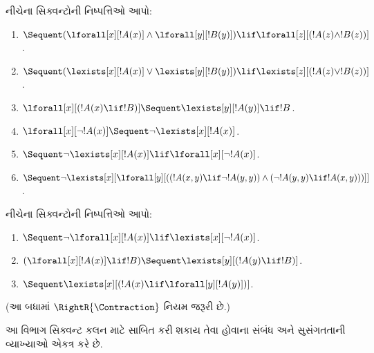 \begin{prob}
નીચેના સિક્વન્ટોની નિષ્પત્તિઓ આપો:
\begin{enumerate}
\item $\Sequent (\lforall[x][!A(x)] \land \lforall[y][!B(y)]) \lif
\lforall[z][(!A(z) \land !B(z))]$.
\item $\Sequent (\lexists[x][!A(x)] \lor \lexists[y][!B(y)]) \lif
\lexists[z][(!A(z) \lor !B(z))]$.
\item $\lforall[x][(!A(x) \lif !B)] \Sequent \lexists[y][!A(y)] \lif !B$.
\item $\lforall[x][\lnot !A(x)] \Sequent \lnot\lexists[x][!A(x)]$.
\item $\Sequent \lnot\lexists[x][!A(x)] \lif \lforall[x][\lnot !A(x)]$.
\item $\Sequent \lnot\lexists[x][\lforall[y][((!A(x,y) \lif \lnot
!A(y,y)) \land (\lnot !A(y,y) \lif !A(x,y)))]]$.
\end{enumerate}
\end{prob}

\begin{prob}
નીચેના સિક્વન્ટોની નિષ્પત્તિઓ આપો:
\begin{enumerate}
\item $\Sequent \lnot\lforall[x][!A(x)] \lif \lexists[x][\lnot!A(x)]$.
\item $(\lforall[x][!A(x)] \lif !B) \Sequent \lexists[y][(!A(y) \lif !B)]$.
\item $\Sequent \lexists[x][(!A(x) \lif \lforall[y][!A(y)])]$.
\end{enumerate}
(આ બધામાં $\RightR{\Contraction}$ નિયમ જરૂરી છે.)
\end{prob}
\endgroup


\begingroup
\makeatletter{}\makeatother

\begin{editorial}
  આ વિભાગ સિક્વન્ટ કલન માટે સાબિત કરી શકાય તેવા હોવાના સંબંધ અને
  સુસંગતતાની વ્યાખ્યાઓ એકત્ર કરે છે.
\end{editorial}


\label{guunit:OLP-0077}


